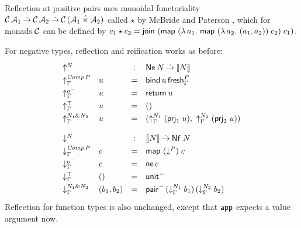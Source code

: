 \documentclass[sigplan,screen,fleqn,review]{acmart} %
\begin{document}
Reflection at positive pairs uses monoidal functoriality
$\mathcal{C}\,\mathcal{A}_1 \mathbin{\dot{\to}} \mathcal{C}\,\mathcal{A}_2 \mathbin{\dot{\to}} \mathcal{C}\,(\mathcal{A}_1 \mathbin{\hat\times} \mathcal{A}_2)$
called $\star$ by McBride and Paterson \cite[Section 7]{mcbridePaterson:applicative},
which for monads $\mathcal{C}$ can be defined by
$c_1 \star c_2 =
   \mathsf{join}^{} \; (\mathsf{map}^{}\;(\lambda\,a_1.\
   \mathsf{map}^{}\;(\lambda\,a_2.\ (a_1,a_2))
    \;c_2)
    \;c_1)$.

For negative types, reflection and reification works as before:
\[
\renewcommand{\left}{}
\renewcommand{\right}{}
\def\arraystretch{1.3}
\begin{array}{llcl} %
  \multicolumn 2 l {\up N} & : & \tNe\,N \todot \den N \\
  \upG {\Comp P} & u & = & \tbind\,u\,\tfresh^P_\Gamma \\
  \upG \natom    & u & = & \treturn\,u \\
  \upG \top      & u & = & \ttempty \\
  \upG {N_1 \ntimes N_2} & u & = & \left(
    \upG {N_1} \; (\prj 1 u)
    ,\
    \upG {N_2} \; (\prj 2 u)
    \right)
\\[2ex]
  \multicolumn 2 l {\down N} & : & \den N \todot \tNf\;N \\
  \downG {\Comp P} & c  & = & \tmap\;(\down P)\;c \\
  \downG \natom    & c  & = & \tne\,c \\
  \downG \top      & () & = & \nunit \\
  \downG {N_1 \ntimes N_2} & (b_1,b_2) & = & \npair
    \, (\downG {N_1} \; b_1)
    \, (\downG {N_2} \; b_2)
    \\
\end{array}
\]
Reflection for function types is also unchanged, except that $\mathsf{app}$
expects a value argument now.
\end{document}
